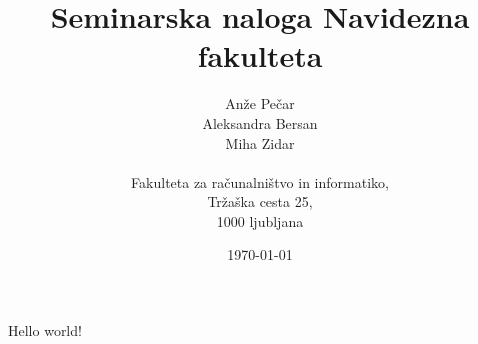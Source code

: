 \documentclass{article}
\begin{document}
\title{Seminarska naloga Navidezna fakulteta}
\author{Anže Pečar\\
        Aleksandra Bersan\\
        Miha Zidar\\\\
	    Fakulteta za računalništvo in informatiko,\\
		Tržaška cesta 25,\\
		1000 ljubljana\\}		
\date{\today}
\maketitle
\pagebreak
Hello world!
\end{document}
